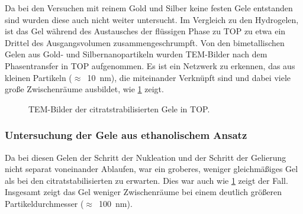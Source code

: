 		Da bei den Versuchen mit reinem Gold und Silber keine festen Gele entstanden sind wurden diese auch nicht weiter untersucht.
		Im Vergleich zu den Hydrogelen, ist das Gel während des Austausches der flüssigen Phase zu TOP zu etwa ein Drittel des Ausgangsvolumen zusammengeschrumpft.
		Von den bimetallischen Gelen aus Gold- und Silbernanopartikeln wurden TEM-Bilder nach dem Phasentransfer in TOP aufgenommen.
		Es ist ein Netzwerk zu erkennen, das aus kleinen Partikeln ($\approx$~\SI{10}{\nano\meter}), die miteinander Verknüpft sind und dabei viele große Zwischenräume ausbildet, wie \cref{fig:Gel-C} zeigt. 
		
		\begin{figure}[H]
			\centering
			\caption{TEM-Bilder der citratstrabilisierten Gele in TOP.}
			\label{fig:Gel-C}
		\end{figure}
		
	\subsubsection{Untersuchung der Gele aus ethanolischem Ansatz}
		
		Da bei diesen Gelen der Schritt der Nukleation und der Schritt der Gelierung nicht separat voneinander Ablaufen, war ein groberes, weniger gleichmäßiges Gel als bei den citratstabilisierten zu erwarten.
		Dies war auch wie \cref{fig:Gel-C} zeigt der Fall.
		Insgesamt zeigt das Gel weniger Zwischenräume bei einem deutlich größeren Partikeldurchmesser ($\approx$~\SI{100}{\nano\meter}).
		
